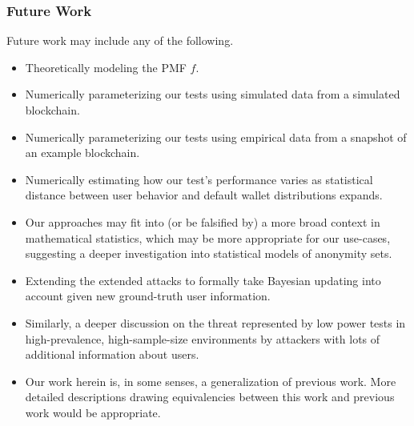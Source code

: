 \documentclass{tran-l}
\theoremstyle{cor}
\theoremstyle{definition}
\theoremstyle{remark}
\theoremstyle{conjecture}
\numberwithin{equation}{section}
\begin{document}
\subsubsection{Future Work}
Future work may include any of the following.
\begin{itemize}
\item Theoretically modeling the PMF $f$.
\item Numerically parameterizing our tests using simulated data from a simulated blockchain.
\item Numerically parameterizing our tests using empirical data from a snapshot of an example blockchain.
\item Numerically estimating how our test's performance varies as statistical distance between user behavior and default wallet distributions expands.
\item Our approaches may fit into (or be falsified by) a more broad context in mathematical statistics, which may be more appropriate for our use-cases, suggesting a deeper investigation into statistical models of anonymity sets.
\item Extending the extended attacks to formally take Bayesian updating into account given new ground-truth user information.
\item Similarly, a deeper discussion on the threat represented by low power tests in high-prevalence, high-sample-size environments by attackers with lots of additional information about users.
\item Our work herein is, in some senses, a generalization of previous work. More detailed descriptions drawing equivalencies between this work and previous work would be appropriate.
\end{itemize}





\end{document}
